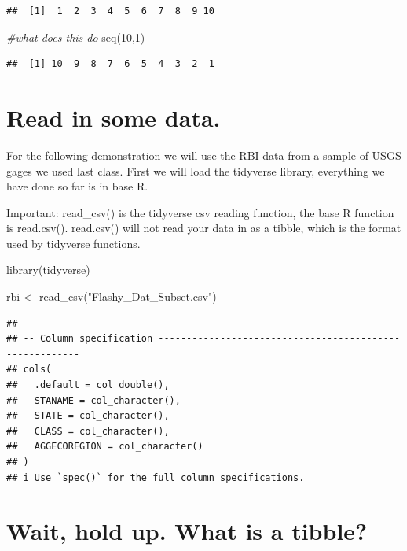 \documentclass[
]{book}
\newenvironment{Shaded}{\begin{snugshade}}{\end{snugshade}}
\newcommand{\CommentTok}[1]{\textcolor[rgb]{0.56,0.35,0.01}{\textit{#1}}}
\newcommand{\DecValTok}[1]{\textcolor[rgb]{0.00,0.00,0.81}{#1}}
\newcommand{\FunctionTok}[1]{\textcolor[rgb]{0.00,0.00,0.00}{#1}}
\newcommand{\NormalTok}[1]{#1}
\newcommand{\OtherTok}[1]{\textcolor[rgb]{0.56,0.35,0.01}{#1}}
\newcommand{\StringTok}[1]{\textcolor[rgb]{0.31,0.60,0.02}{#1}}
\begin{document}
\begin{verbatim}
##  [1]  1  2  3  4  5  6  7  8  9 10
\end{verbatim}

\begin{Shaded}
\begin{Highlighting}[]
\CommentTok{\#what does this do}
\FunctionTok{seq}\NormalTok{(}\DecValTok{10}\NormalTok{,}\DecValTok{1}\NormalTok{)}
\end{Highlighting}
\end{Shaded}

\begin{verbatim}
##  [1] 10  9  8  7  6  5  4  3  2  1
\end{verbatim}

\hypertarget{read-in-some-data.}{%
\section{Read in some data.}\label{read-in-some-data.}}

For the following demonstration we will use the RBI data from a sample of USGS gages we used last class. First we will load the tidyverse library, everything we have done so far is in base R.

Important: read\_csv() is the tidyverse csv reading function, the base R function is read.csv(). read.csv() will not read your data in as a tibble, which is the format used by tidyverse functions.

\begin{Shaded}
\begin{Highlighting}[]
\FunctionTok{library}\NormalTok{(tidyverse)}

\NormalTok{rbi }\OtherTok{\textless{}{-}} \FunctionTok{read\_csv}\NormalTok{(}\StringTok{"Flashy\_Dat\_Subset.csv"}\NormalTok{)}
\end{Highlighting}
\end{Shaded}

\begin{verbatim}
## 
## -- Column specification --------------------------------------------------------
## cols(
##   .default = col_double(),
##   STANAME = col_character(),
##   STATE = col_character(),
##   CLASS = col_character(),
##   AGGECOREGION = col_character()
## )
## i Use `spec()` for the full column specifications.
\end{verbatim}

\hypertarget{wait-hold-up.-what-is-a-tibble}{%
\section{Wait, hold up. What is a tibble?}\label{wait-hold-up.-what-is-a-tibble}}
\end{document}
